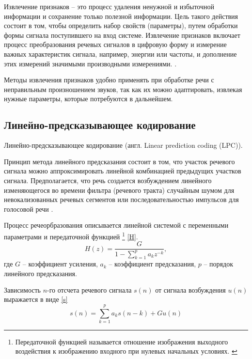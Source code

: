 Извлечение признаков -- это процесс удаления ненужной и избыточной информации и сохранение только полезной информации. Цель такого действия состоит в том, чтобы определить набор свойств (параметры), путем обработки формы сигнала поступившего на вход системе.  Извлечение признаков включает процесс преобразования речевых сигналов в цифровую форму и измерение важных характеристик сигнала, например, энергии или частоты, и дополнение этих измерений значимыми производными измерениями. \cite{isvparam1} \cite{isvparam2}.

Методы извлечения признаков удобно применять при обработке речи с неправильным произношением звуков, так как их можно адаптировать, извлекая нужные параметры, которые потребуются в дальнейшем.

\subsection{Линейно-предсказывающее кодирование}
Линейно-предсказывающее кодирование (англ. Linear prediction coding (LPC)).


Принцип метода линейного предсказания состоит в том, что участок речевого сигнала можно аппроксимировать линейной комбинацией предыдущих участков сигнала. Предполагается, что речь создается возбуждением линейного изменяющегося во времени фильтра (речевого тракта) случайным шумом для невокализованных речевых сегментов или последовательностью импульсов для голосовой речи \cite{methodisb}.

Процесс речеорбразования описывается линейной системой с переменными параметрами и передаточной функцией \footnote{Передаточной функцией называется отношение изображения выходного воздействия к изображению входного при нулевых начальных условиях. \cite{peredfunc}} \eqref{H}.
\begin{equation}
\label{H}
H(z) = \frac{G}{1 - \sum_{k = 1}^{p} a_k z^{-k}},
\end{equation}
где $G$ -- коэффициент усиления, $a_k$ -- коэффициент предсказания, $p$ -- порядок линейного предсказания.

Зависимость $n$-го отсчета речевого сигнала $s(n)$ от сигнала возбуждения $u(n)$ выражается в виде \eqref{s}
\begin{equation}
\label{s}
s(n) = \sum_{k = 1}^{p} a_k s(n - k) + G u(n)
\end{equation}

